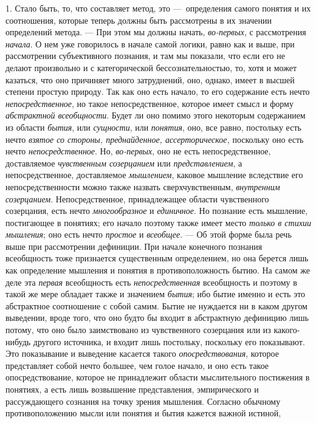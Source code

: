 \documentclass[twoside]{article}
\begin{document}
1. Стало быть, то, что составляет метод, это
—~определения самого понятия и их соотношения, которые теперь
должны быть рассмотрены в их значении определений метода. —
При этом мы должны начать,
{\em во-первых}, с
рассмотрения {\em начала}.
О нем уже говорилось в начале самой логики, равно как и выше,
при рассмотрении субъективного познания, и там мы показали, что если его не
делают произвольно и с категорической бессознательностью, то, хотя и может
казаться, что оно причиняет много затруднений, оно, однако,
имеет в высшей степени простую природу. Так как оно есть начало, то его
содержание есть нечто
{\em непосредственное},
но такое непосредственное, которое имеет смысл и форму
{\em абстрактной всеобщности}.
Будет ли оно помимо этого некоторым содержанием из области
{\em бытия}, или
{\em сущности}, или
{\em понятия}, оно, все
равно, постольку есть нечто {\em взятое
со стороны, преднайденное, ассерторическое,} поскольку оно
есть нечто {\em непосредственное}.
Но, {\em во-первых},
оно не есть непосредственное, доставляемое
{\em чувственным созерцанием}
или {\em представлением},
а непосредственное, доставляемое
{\em мышлением}, каковое
мышление вследствие его непосредственности можно также назвать
сверхчувственным, {\em внутренним
созерцанием}. Непосредственное, принадлежащее области
чувственного созерцания, есть нечто
{\em многообразное} и
{\em единичное}. Но
познание есть мышление, постигающее в понятиях; его начало поэтому также
имеет место {\em только в стихии
мышления}; оно есть нечто
{\em простое} и
{\em всеобщее}. — Об этой
форме была речь выше при рассмотрении дефиниции. При начале конечного
познания всеобщность тоже признается существенным определением, но она
берется лишь как определение мышления и понятия в противоположность бытию.
На самом же деле эта {\em первая}
всеобщность есть
{\em непосредственная}
всеобщность и поэтому в такой же мере обладает также и
значением {\em бытия};
ибо бытие именно и есть это абстрактное соотношение с собой
самим. Бытие не нуждается ни в каком другом выведении, вроде того, что оно
будто бы входит в абстрактную дефиницию лишь потому, что оно было
заимствовано из чувственного созерцания или из какого-нибудь другого
источника, и входит лишь постольку, поскольку его показывают. Это
показывание и выведение касается такого
{\em опосредствования},
которое представляет собой нечто большее, чем голое начало, и
оно есть такое опосредствование, которое не принадлежит области
мыслительного постижения в понятиях, а есть лишь возвышение представления,
эмпирического и рассуждающего сознания на точку зрения мышления. Согласно
обычному противоположению мысли или понятия и бытия кажется важной истиной,
\end{document}
